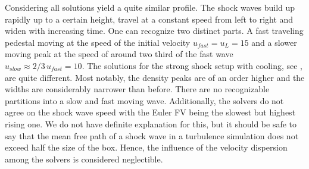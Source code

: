 Considering  all solutions yield a
quite similar profile. The shock waves build up rapidly up to a certain
height, travel at a constant speed from left to right and widen with increasing
time. One can recognize two distinct parts. A fast traveling pedestal moving at
the speed of the initial velocity $u_{fast} = u_L = 15$ and a slower moving
peak at the speed of around two third of the fast wave $u_{slow} \approx
2/3\,u_{fast} = 10$. 
The solutions for the strong shock setup with cooling, see
, are quite different. Most
notably, the density peaks are of an order higher and the widths are
considerably narrower than before. There are no recognizable partitions into a
slow and fast moving wave. Additionally, the solvers do not agree on the shock
wave speed with the Euler FV  being the slowest but highest rising one. We do
not have definite explanation for this, but it should be safe to say that the
mean free path of a shock wave in a turbulence simulation does not exceed half
the size of the box. Hence, the influence of the velocity dispersion among the
solvers is considered neglectible.



